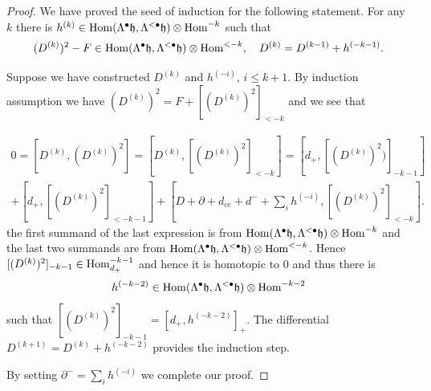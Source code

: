 \begin{proof}
We have proved the seed of induction for the following statement. For any $k$ there is $h^{(k)}\in \mathop{{\rm Hom}}\nolimits(\Lambda^{\bullet}\mathfrak{h},\Lambda^{<\bullet}\mathfrak{h})\otimes \mathop{{\rm Hom}}\nolimits^{-k}$ such that
$$ (D^{(k)})^2-F\in \mathop{{\rm Hom}}\nolimits( \Lambda^\bullet\mathfrak{h},\Lambda^{<\bullet}\mathfrak{h}) \otimes \mathop{{\rm Hom}}\nolimits^{<-k},\quad  D^{(k)}=D^{(k-1)}+h^{(-k-1)}.$$

Suppose we have constructed $D^{(k)}$ and $h^{(-i)}$, $i\le k+1$. By induction assumption we have $ (D^{(k)})^2=
F+[(D^{(k)})^2]_{<-k}$ and we see that

\begin{multline*}
0=[D^{(k)}, (D^{(k)})^2]=[D^{(k)},[(D^{(k)})^2]_{<-k}]=[d_+, [(D^{(k)})^2)]_{-k-1}]\\+[d_+,[(D^{(k)})^2]_{<-k-1}]+[D+\partial+d_{ce}+d^-+\sum_i h^{(-i)},[(D^{(k)})^2]_{<-k}].
\end{multline*}
the first summand of the last expression is from $\mathop{{\rm Hom}}\nolimits(\Lambda^\bullet\mathfrak{h},\Lambda^{<\bullet}\mathfrak{h})\otimes \mathop{{\rm Hom}}\nolimits^{-k}$ and the last two summands are from
$\mathop{{\rm Hom}}\nolimits(\Lambda^\bullet\mathfrak{h},\Lambda^{<\bullet}\mathfrak{h})\otimes \mathop{{\rm Hom}}\nolimits^{<-k}$. Hence $[(D^{(k)})^2]_{-k-1}\in \mathop{{\rm Hom}}\nolimits_{d_+}^{-k-1}$ and hence it is homotopic to $0$ and thus there
is \[h^{(-k-2)}\in \mathop{{\rm Hom}}\nolimits(\Lambda^\bullet\mathfrak{h},\Lambda^{<\bullet}\mathfrak{h})\otimes \mathop{{\rm Hom}}\nolimits^{-k-2}\] such that $[(D^{(k)})^2]_{-k-1}=[d_+,h^{(-k-2)}]_+$.
The differential $D^{(k+1)}=D^{(k)}+h^{(-k-2)}$ provides the induction step.

By setting $\partial^-=\sum_{i} h^{(-i)}$ we complete our proof.
\end{proof}



